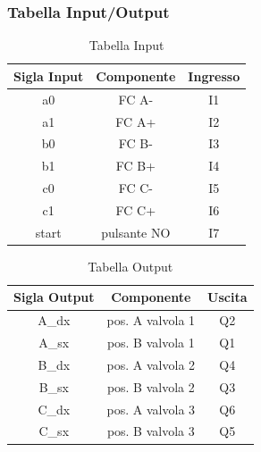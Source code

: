 \documentclass[12pt]{article}
\begin{document}
\subsubsection{Tabella Input/Output}
\begin{table}[H]
	\centering
	\begin{tabular}{|c|c|c|} \hline
		\rowcolor{Blue!80}  Sigla Input     & Componente  & Ingresso \\
		\hline
		\rowcolor{LimeGreen!50}  a0    & FC A-       & I1       \\
		\hline
		\rowcolor{Green!50}    a1       & FC A+       & I2       \\
		\hline
		\rowcolor{LimeGreen!50}  b0    & FC B-       & I3       \\
		\hline
		\rowcolor{Green!50}    b1       & FC B+       & I4       \\
		\hline
		\rowcolor{LimeGreen!50}  c0    & FC C-       & I5       \\
		\hline
		\rowcolor{Green!50}    c1       & FC C+       & I6       \\
		\hline
		\rowcolor{LimeGreen!50}  start & pulsante NO & I7       \\
		\hline
	\end{tabular}
	\caption{Tabella Input}
\end{table}

\begin{table}[H]
	\centering
	\begin{tabular}{|c|c|c|} \hline
		\rowcolor{Blue!80}  Sigla Output    & Componente       & Uscita \\
		\hline
		\rowcolor{LimeGreen!50}  A\_dx & pos. A valvola 1 & Q2     \\
		\hline
		\rowcolor{Green!50}    A\_sx    & pos. B valvola 1 & Q1     \\
		\hline
		\rowcolor{LimeGreen!50}  B\_dx & pos. A valvola 2 & Q4     \\
		\hline
		\rowcolor{Green!50}    B\_sx    & pos. B valvola 2 & Q3     \\
		\hline
		\rowcolor{LimeGreen!50}  C\_dx & pos. A valvola 3 & Q6     \\
		\hline
		\rowcolor{Green!50}    C\_sx    & pos. B valvola 3 & Q5     \\
		\hline
	\end{tabular}
	\caption{Tabella Output}
\end{table}
\newpage
\end{document}
